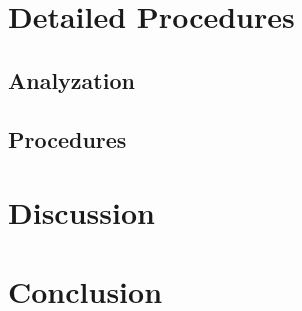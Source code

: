 \section{Detailed Procedures}
    \subsection{Analyzation}


    \subsection{Procedures}

    
\section{Discussion}


\section{Conclusion}
